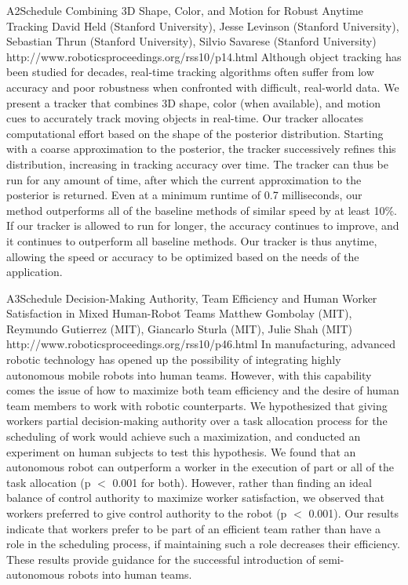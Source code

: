 \begin{spacing}{1.0}
\descriptionPaper
{A2}{Schedule}
{
Combining 3D Shape, Color, and Motion for Robust Anytime Tracking 
}
{
David Held (Stanford University), Jesse Levinson (Stanford University), Sebastian Thrun (Stanford University), Silvio Savarese (Stanford University)
}
{
http://www.roboticsproceedings.org/rss10/p14.html
}
{
Although object tracking has been studied for decades, real-time tracking algorithms often suffer from low accuracy and poor robustness when confronted with difficult, real-world data. We present a tracker that combines 3D shape, color (when available), and motion cues to accurately track moving objects in real-time. Our tracker allocates computational effort based on the shape of the posterior distribution. Starting with a coarse approximation to the posterior, the tracker successively refines this distribution, increasing in tracking accuracy over time. The tracker can thus be run for any amount of time, after which the current approximation to the posterior is returned. Even at a minimum runtime of 0.7 milliseconds, our method outperforms all of the baseline methods of similar speed by at least 10\%. If our tracker is allowed to run for longer, the accuracy continues to improve, and it continues to outperform all baseline methods. Our tracker is thus anytime, allowing the speed or accuracy to be optimized based on the needs of the application.
}


\descriptionPaper
{A3}{Schedule}
{
Decision-Making Authority, Team Efficiency and Human Worker Satisfaction in Mixed Human-Robot Teams 
}
{
Matthew Gombolay (MIT), Reymundo Gutierrez (MIT), Giancarlo Sturla (MIT), Julie Shah (MIT)
}
{
http://www.roboticsproceedings.org/rss10/p46.html
}
{
In manufacturing, advanced robotic technology has opened up the possibility of integrating highly autonomous mobile robots into human teams. However, with this capability comes the issue of how to maximize both team efficiency and the desire of human team members to work with robotic counterparts. We hypothesized that giving workers partial decision-making authority over a task allocation process for the scheduling of work would achieve such a maximization, and conducted an experiment on human subjects to test this hypothesis. We found that an autonomous robot can outperform a worker in the execution of part or all of the task allocation (p $<$ 0.001 for both). However, rather than finding an ideal balance of control authority to maximize worker satisfaction, we observed that workers preferred to give control authority to the robot (p $<$ 0.001). Our results indicate that workers prefer to be part of an efficient team rather than have a role in the scheduling process, if maintaining such a role decreases their efficiency. These results provide guidance for the successful introduction of semi-autonomous robots into human teams.
}



\end{spacing}
